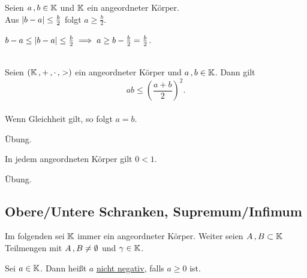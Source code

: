 \documentclass[../ana1.tex]{subfiles}
\begin{document}
\begin{bsp}
	Seien \(a \operatorname{,} b \in \mathbb{K} \) und \(\mathbb{K} \) ein angeordneter Körper. \\
	Aus \(\left|b - a\right| \leq \frac{b}{2} \) folgt \(a \geq \frac{b}{2} \).
\end{bsp}
\begin{bew}
	\(b-a \leq \left|b-a\right| \leq \frac{b}{2} \implies a \geq b - \frac{b}{2} = \frac{b}{2} \).
\end{bew}

\begin{kor}\label{kor:gaungl}\leavevmode \\
	Seien \((\mathbb{K} \operatorname{,} + \operatorname{,} \cdot \operatorname{,} >) \) ein angeordneter Körper und \(a \operatorname{,} b \in \mathbb{K} \). Dann gilt \\
		\[ab \leq {\left( \frac{a + b}{2}\right)}^{2}. \] \\
	Wenn Gleichheit gilt, so folgt \(a=b \).
\end{kor}
\begin{bew}
	Übung.\phantom{\qedhere}
\end{bew}

\begin{bem}
	In jedem angeordneten Körper gilt \(0 < 1 \).
\end{bem}
\begin{bew}
	Übung.\phantom{\qedhere}
\end{bew}


\subsection{Obere/Untere Schranken, Supremum/Infimum}
\begin{prosa}
	Im folgenden sei \(\mathbb{K} \) immer ein angeordneter Körper. Weiter seien \(A \operatorname{,} B \subset \mathbb{K} \) Teilmengen mit \(A \operatorname{,} B \neq \emptyset \) und
	\(\gamma \in \mathbb{K} \).
\end{prosa}

\begin{notation}
	Sei \(a \in \mathbb{K} \). Dann heißt \(a \) \underline{nicht negativ}, falls \(a \geq 0 \) ist.
\end{notation}
\end{document}

